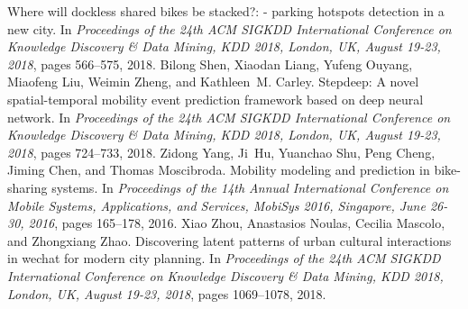 \documentclass[conference]{IEEEtran}
\begin{document}
\begin{thebibliography}{00}
\newblock Where will dockless shared bikes be stacked?: - parking hotspots
detection in a new city.
\newblock In {\em Proceedings of the 24th {ACM} {SIGKDD} International
	Conference on Knowledge Discovery {\&} Data Mining, {KDD} 2018, London, UK,
	August 19-23, 2018}, pages 566--575, 2018.
 Bilong Shen, Xiaodan Liang, Yufeng Ouyang, Miaofeng Liu, Weimin Zheng, and
Kathleen~M. Carley.
\newblock Stepdeep: A novel spatial-temporal mobility event prediction
framework based on deep neural network.
\newblock In {\em Proceedings of the 24th {ACM} {SIGKDD} International
	Conference on Knowledge Discovery {\&} Data Mining, {KDD} 2018, London, UK,
	August 19-23, 2018}, pages 724--733, 2018.
 Zidong Yang, Ji~Hu, Yuanchao Shu, Peng Cheng, Jiming Chen, and Thomas
Moscibroda.
\newblock Mobility modeling and prediction in bike-sharing systems.
\newblock In {\em Proceedings of the 14th Annual International Conference on
	Mobile Systems, Applications, and Services, MobiSys 2016, Singapore, June
	26-30, 2016}, pages 165--178, 2016.
 Xiao Zhou, Anastasios Noulas, Cecilia Mascolo, and Zhongxiang Zhao.
\newblock Discovering latent patterns of urban cultural interactions in wechat
for modern city planning.
\newblock In {\em Proceedings of the 24th {ACM} {SIGKDD} International
	Conference on Knowledge Discovery {\&} Data Mining, {KDD} 2018, London, UK,
	August 19-23, 2018}, pages 1069--1078, 2018.
\end{thebibliography}
\end{document}

